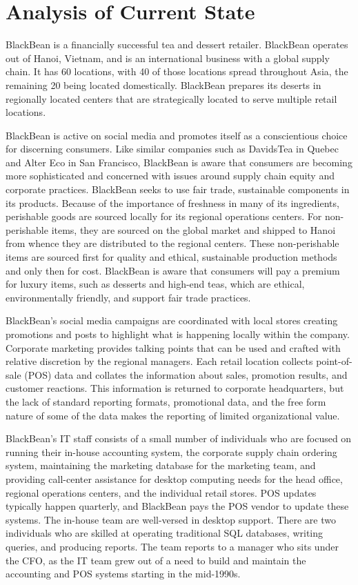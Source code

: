 \section{Analysis of Current State}

BlackBean is a financially successful tea and dessert retailer. BlackBean operates out of Hanoi, Vietnam, and is an international  business with a global supply chain. It has 60 locations, with 40 of those locations spread throughout Asia, the remaining 20 being located domestically. BlackBean prepares its deserts in regionally located centers that are strategically located to serve multiple retail locations.

BlackBean is active on social media and promotes itself as a conscientious choice for discerning consumers. Like similar companies such as DavidsTea in Quebec and Alter Eco in San Francisco, BlackBean is aware that consumers are becoming more sophisticated and concerned with issues around supply chain equity and corporate practices. BlackBean seeks to use fair trade, sustainable components in its products. Because of the importance of freshness in many of its ingredients, perishable goods are sourced locally for its regional operations centers. For non-perishable items, they are sourced on the global market and shipped to Hanoi from whence they are distributed to the regional centers. These non-perishable items are sourced first for quality and ethical, sustainable production methods and only then for cost. BlackBean is aware that consumers will pay a premium for luxury items, such as desserts and high-end teas, which are ethical, environmentally friendly, and support fair trade practices.

BlackBean's social media campaigns are coordinated with local stores creating promotions and posts to highlight what is happening locally within the company. Corporate marketing provides talking points that can be used and crafted with relative discretion by the regional managers. Each retail location collects point-of-sale (POS) data and collates the information about sales, promotion results, and customer reactions. This information is returned to corporate headquarters, but the lack of standard reporting formats, promotional data, and the free form nature of some of the data makes the reporting of limited organizational value.

BlackBean's IT staff consists of a small number of individuals who are focused on running their in-house accounting system, the corporate supply chain ordering system, maintaining the marketing database for the marketing team, and providing call-center assistance for desktop computing needs for the head office, regional operations centers, and the individual retail stores. POS updates typically happen quarterly, and BlackBean pays the POS vendor to update these systems. The in-house team are well-versed in desktop support. There are two individuals who are skilled at operating traditional SQL databases, writing queries, and producing reports. The team reports to a manager who sits under the CFO, as the IT team grew out of a need to build and maintain the accounting and POS systems starting in the mid-1990s.

